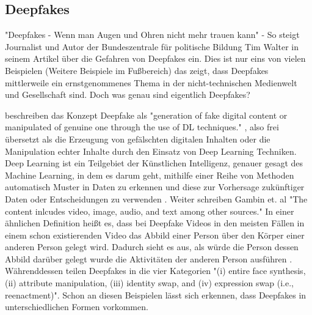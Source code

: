 \subsection{Deepfakes}
"Deepfakes - Wenn man Augen und Ohren nicht mehr trauen kann" \cite{bildungDeepfakesWennMan2023} - 
So steigt Journalist und Autor der Bundeszentrale für politische Bildung Tim Walter in seinem Artikel über die Gefahren von Deepfakes ein. 
Dies ist nur eins von vielen Beispielen (Weitere Beispiele im Fußbereich) das zeigt, 
dass Deepfakes mittlerweile ein ernstgenommenes Thema in der nicht-technischen Medienwelt und Gesellschaft sind. 
Doch was genau sind eigentlich Deepfakes? 

\textcite{gambinDeepfakesCurrentFuture2024} beschreiben das Konzept Deepfake als "generation of fake digital content or manipulated of genuine one through the use of DL techniques." \cite[S. ?]{gambinDeepfakesCurrentFuture2024},
also frei übersetzt als die Erzeugung von gefälschten digitalen Inhalten oder die Manipulation echter Inhalte durch den Einsatz von Deep Learning Techniken. 
Deep Learning ist ein Teilgebiet der Künstlichen Intelligenz, genauer gesagt des Machine Learning, in dem es darum geht, mithilfe einer Reihe von Methoden automatisch Muster in Daten zu erkennen und diese zur Vorhersage zukünftiger Daten oder Entscheidungen zu verwenden \autocite[S. 1]{murphyMachineLearningProbabilistic2012} . 
Weiter schreiben Gambin et. al "The content inlcudes video, image, audio, and text among other sources." 
In einer ähnlichen Definition heißt es, dass bei Deepfake Videos in den meisten Fällen in einem schon existierenden Video das Abbild einer Person über den Körper einer anderen Person gelegt wird. 
Dadurch sieht es aus, als würde die Person dessen Abbild darüber gelegt wurde die Aktivitäten der anderen Person ausführen \autocite{harrisVideoDemandWhat2021}.
Währenddessen teilen \textcite{juefei-xuCounteringMaliciousDeepFakes2022} Deepfakes in die vier Kategorien "(i) entire face synthesis, (ii) attribute manipulation, (iii) identity swap, and (iv) expression swap (i.e., reenactment)". 
Schon an diesen Beispielen lässt sich erkennen, dass Deepfakes in unterschiedlichen Formen vorkommen.


